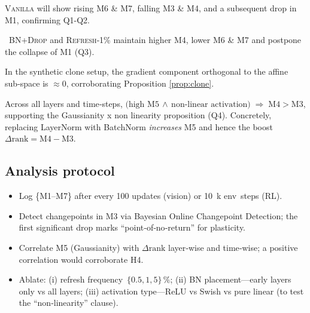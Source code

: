 \documentclass[11pt]{article}
\begin{document}
\begin{description}[leftmargin=0pt]
\item[H1]\textsc{Vanilla} will show rising M6 \& M7,
          falling M3 \& M4, and a subsequent drop in M1,
confirming Q1-Q2.  
\item[H2] \textsc{BN+Drop} and \textsc{Refresh‑1\%}
          maintain higher M4, lower M6 \& M7
          and postpone the collapse of M1 (Q3).  
\item[H3] In the synthetic clone setup, the gradient component
          orthogonal to the affine sub‑space is $\approx0$,
          corroborating Proposition \ref{prop:clone}.  
\item[H4] Across all layers and time‑steps,
          $\bigl(\text{high M5} \,\wedge\, \text{non‑linear activation}\bigr)
          \;\Longrightarrow\; \text{M4} > \text{M3}$,
          supporting the Gaussianity x non linearity proposition (Q4).  
          Concretely, replacing LayerNorm with BatchNorm
          \emph{increases} M5 and hence the boost
          $\Delta\text{rank} = \text{M4} - \text{M3}$.
\end{description}

\subsection{Analysis protocol}

\begin{itemize}[nosep]
  \item Log \{M1–M7\} after every 100 updates (vision) or
        10 k env steps (RL).  
  \item Detect changepoints in M3 via Bayesian Online Changepoint
        Detection; the first significant drop marks
        “point‑of‑no‑return” for plasticity.  
  \item Correlate M5 (Gaussianity) with $\Delta\text{rank}$ layer‑wise
        and time‑wise; a positive correlation would corroborate H4.  
  \item Ablate: (i) refresh frequency $\{0.5,1,5\}\,\%$;
        (ii) BN placement—early layers only vs all layers;
        (iii) activation type—ReLU vs Swish vs pure linear
        (to test the “non‑linearity” clause).  
\end{itemize}
\end{document}

